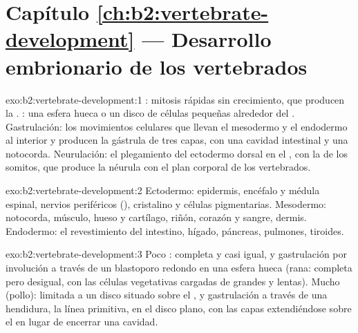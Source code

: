 \section*{Capítulo \ref{ch:b2:vertebrate-development} --- Desarrollo embrionario de los vertebrados}

\begin{solution}{exo:b2:vertebrate-development:1}
: mitosis rápidas sin crecimiento, que producen la .
: una esfera hueca o un disco de células pequeñas alrededor del
. Gastrulación: los movimientos celulares que llevan el
mesodermo y el endodermo al interior y producen la gástrula de tres capas,
con una cavidad intestinal y una notocorda. Neurulación: el plegamiento
del ectodermo dorsal en el , con la  de los
somitos, que produce la néurula con el plan corporal de los vertebrados.
\end{solution}

\begin{solution}{exo:b2:vertebrate-development:2}
Ectodermo: epidermis, encéfalo y médula espinal, nervios periféricos
(), cristalino y células pigmentarias. Mesodermo: notocorda,
músculo, hueso y cartílago, riñón, corazón y sangre, dermis. Endodermo:
el revestimiento del intestino, hígado, páncreas, pulmones, tiroides.
\end{solution}

\begin{solution}{exo:b2:vertebrate-development:3}
Poco :  completa y casi igual, y gastrulación por
involución a través de un blastoporo redondo en una esfera hueca (rana:
completa pero desigual, con las células vegetativas cargadas de 
grandes y lentas). Mucho  (pollo):  limitada a un disco
situado sobre el , y gastrulación a través de una hendidura, la
línea primitiva, en el disco plano, con las capas extendiéndose sobre el
 en lugar de encerrar una cavidad.
\end{solution}

